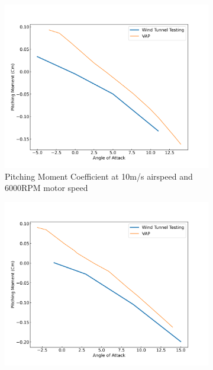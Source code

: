 \begin{figure}[H]
    \centering
    \begin{subfigure}[b]{0.467\textwidth}
        \centering
        \includegraphics[width=\textwidth]{05_Results/VAP/noProp/Cm/10ms_6000RPM_Cm.png}
        \caption{Pitching Moment Coefficient at 10m/s airspeed and 6000RPM motor speed}
        \label{fig:VAP_NoProp_Cm_10ms_6000}
    \end{subfigure}
    \begin{subfigure}[b]{0.467\textwidth}
        \centering
        \includegraphics[width=\textwidth]{05_Results/VAP/noProp/Cm/10ms_11000RPM_Cm.png}

\end{subfigure}
\end{figure}
